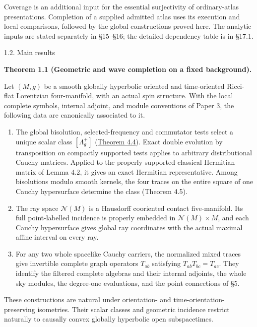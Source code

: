 \documentclass[
  english,
  11pt,
  reqno]{amsart}
\makeatletter
\providecommand{\tightlist}{%
  \setlength{\itemsep}{0pt}\setlength{\parskip}{0pt}}
\newcommand{\paperstatementsection}{\@startsection{subsection}{2}%
  \z@{.5\linespacing\@plus.7\linespacing}{.35\baselineskip}%
  {\normalfont\bfseries}}
\newcommand{\paperfirststatement}[1]{%
  {\normalfont\bfseries #1\par}%
  \nobreak\@afterindenttrue\@afterheading}
\makeatother
\begin{document}
Coverage is an additional input for the essential surjectivity of
ordinary-atlas presentations. Completion of a supplied admitted atlas
uses its execution and local comparisons, followed by the global
constructions proved here. The analytic inputs are stated separately in
§15--§16; the detailed dependency table is in §17.1.

\protect{}\label{sec:overview-main-results}
\paperstatementsection{1.2. Main results}\label{main-results}
\paperfirststatement{\protect{}\label{thm:global-wave-completion-overview}Theorem 1.1 (Geometric and wave completion on a fixed background).}

Let \((M,g)\) be a smooth globally hyperbolic oriented and time-oriented
Ricci-flat Lorentzian four-manifold, with an actual spin structure. With
the local complete symbols, internal adjoint, and module conventions of
Paper 3, the following data are canonically associated to it.

\begin{enumerate}
\tightlist
\item
  The global bisolution, selected-frequency and commutator tests select
  a unique scalar class \([\Lambda_g^+]\)
  (\hyperref[thm:p4-global-canonical-wave-class]{Theorem 4.4}). Exact
  double evolution by transposition on compactly supported tests applies
  to arbitrary distributional Cauchy matrices. Applied to the properly
  supported classical Hermitian matrix of Lemma 4.2, it gives an exact
  Hermitian representative. Among bisolutions modulo smooth kernels, the
  four traces on the entire square of one Cauchy hypersurface determine
  the class (Theorem 4.5).
\item
  The ray space \(\mathcal N(M)\) is a Hausdorff cooriented contact
  five-manifold. Its full point-labelled incidence is properly embedded
  in \(\mathcal N(M)\times M\), and each Cauchy hypersurface gives
  global ray coordinates with the actual maximal affine interval on
  every ray.
\item
  For any two whole spacelike Cauchy carriers, the normalized mixed
  traces give invertible complete graph operators \(T_{ab}\) satisfying
  \(T_{ab}T_{bc}=T_{ac}\). They identify the filtered complete algebras
  and their internal adjoints, the whole sky modules, the degree-one
  evaluations, and the point connections of §5.
\end{enumerate}

These constructions are natural under orientation- and
time-orientation-preserving isometries. Their scalar classes and
geometric incidence restrict naturally to causally convex globally
hyperbolic open subspacetimes.
\end{document}
